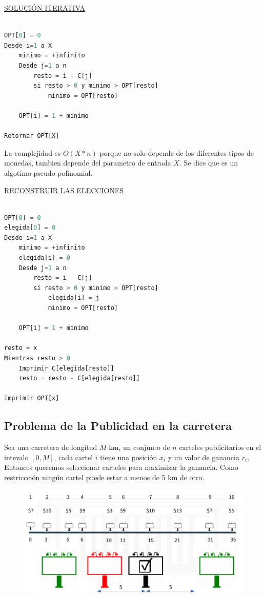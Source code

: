 \documentclass{article}
\begin{document}
\noindent
\underline{SOLUCIÓN ITERATIVA}
\begin{lstlisting}[language=Python, caption=Solución iterativa]

OPT[0] = 0
Desde i=1 a X
    minimo = +infinito
    Desde j=1 a n
        resto = i - C[j]
        si resto > 0 y minimo > OPT[resto]
            minimo = OPT[resto]
    
    OPT[i] = 1 + minimo

Retornar OPT[X]
\end{lstlisting}

La complejidad es \(O(X*n)\) porque no solo depende de los diferentes tipos de monedas, tambien
depende del parametro de entrada \(X\). Se dice que es un algotimo pseudo polinomial.

\noindent
\underline{RECONSTRUIR LAS ELECCIONES}

\begin{lstlisting}[language=Python, caption=Solución iterativa con reconstrucción]

OPT[0] = 0
elegida[0] = 0
Desde i=1 a X
    minimo = +infinito
    elegida[i] = 0
    Desde j=1 a n
        resto = i - C[j]
        si resto > 0 y minimo > OPT[resto]
            elegida[i] = j
            minimo = OPT[resto]
    
    OPT[i] = 1 + minimo

resto = x
Mientras resto > 0
    Imprimir C[elegida[resto]]
    resto = resto - C[elegida[resto]]

Imprimir OPT[x]

\end{lstlisting}

\newpage
\subsection{Problema de la Publicidad en la carretera}

Sea una carretera de longitud \(M\) km, un conjunto de \(n\) carteles publicitarios en el 
intevalo \([0,M]\), cada cartel \(i\) tiene una posición \(x_i\) y un valor de ganancia \(r_i\).
Entonces queremos seleccionar carteles para maximizar la ganancia. Como restriccción ningún cartel
puede estar a menos de 5 km de otro.

\begin{figure}[h!]
    \includegraphics[scale=0.4]{imagenes/dinamico-ejemplo-ruta.png}
\end{figure}
\end{document}
